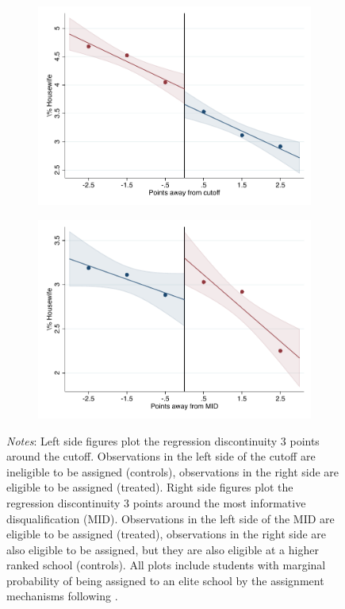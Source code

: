 \documentclass[oneside,11pt]{article}
\begin{document}
\begin{figure}[H]
\begin{center}
    \begin{subfigure}{0.475\textwidth}
        \centering
        \includegraphics[width=\textwidth]{04_Figures/rd_plot_tau_Housewife_UNAM3.pdf}
    \end{subfigure}
    \begin{subfigure}{0.475\textwidth}
        \centering
        \includegraphics[width=\textwidth]{04_Figures/rd_plot_mid_Housewife_UNAM3.pdf}
    \end{subfigure}
    \end{center}
    
\footnotesize
\textit{Notes}: Left side figures plot the regression discontinuity 3 points around the cutoff. Observations in the left side of the cutoff are ineligible to be assigned (controls), observations in the right side are eligible to be assigned (treated). Right side figures plot the regression discontinuity 3 points around the most informative disqualification (MID). Observations in the left side of the MID are eligible to be assigned (treated), observations in the right side are also eligible to be assigned, but they are also eligible at a higher ranked school (controls). All plots include students with marginal probability of being assigned to an elite school by the assignment mechanisms following \citet{abdulkadirouglu2022breaking}. 
\end{figure}
\end{document}
